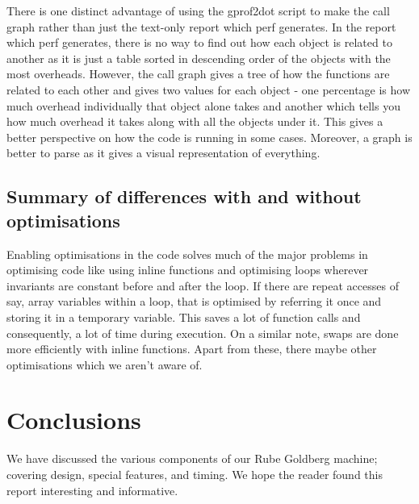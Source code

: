 \documentclass[a4paper,11pt]{article}
\begin{document}
	There is one distinct advantage of using the gprof2dot script to make the call graph rather than just the text-only report which perf generates. In the report which perf generates, there is no way to find out how each object is related to another as it is just a table sorted in descending order of the objects with the most overheads. However, the call graph gives a tree of how the functions are related to each other and gives two values for each object - one percentage is how much overhead individually that object alone takes and another which tells you how much overhead it takes along with all the objects under it. This gives a better perspective on how the code is running in some cases. Moreover, a graph is better to parse as it gives a visual representation of everything.

	\subsection{Summary of differences with and without optimisations}

	Enabling optimisations in the code solves much of the major problems in optimising code like using inline functions and optimising loops wherever invariants are constant before and after the loop. If there are repeat accesses of say, array variables within a loop, that is optimised by referring it once and storing it in a temporary variable. This saves a lot of function calls and consequently, a lot of time during execution. On a similar note, swaps are done more efficiently with inline functions. Apart from these, there maybe other optimisations which we aren't aware of.


\pagebreak
   \section{Conclusions}
  
     We have discussed the various components of our Rube Goldberg machine; covering design, special features, and timing. We hope the reader found this report interesting and informative.
  
\end{document}
